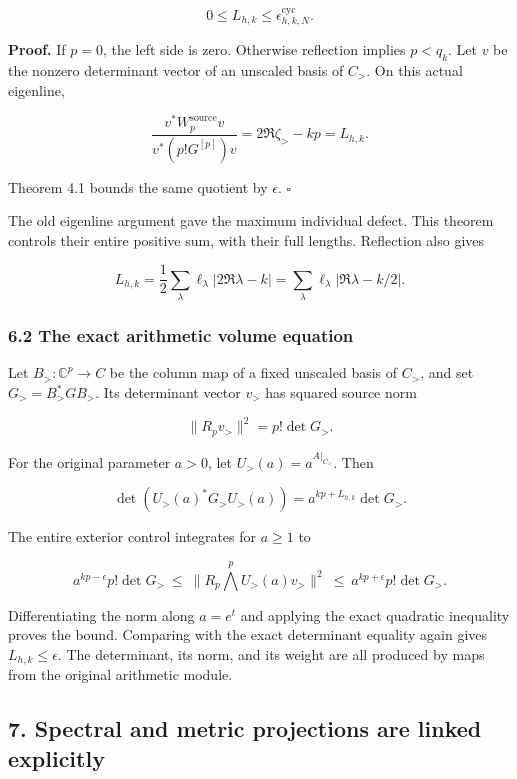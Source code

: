 \[
\boxed{0\leq L_{h,k}\leq\epsilon_{h,k,N}^{\mathrm{cyc}}.}
\]

\textbf{Proof.} If \(p=0\), the left side is zero. Otherwise reflection
implies \(p<q_k\). Let \(v\) be the nonzero determinant vector of an
unscaled basis of \(C_{>}\). On this actual eigenline,

\[
\frac{v^*W_p^{\mathrm{source}}v}{v^*(p!G^{[p]})v}
=2\Re\zeta_{>}-kp=L_{h,k}.
\]

Theorem 4.1 bounds the same quotient by \(\epsilon\). \(\square\)

The old eigenline argument gave the maximum individual defect. This
theorem controls their entire positive sum, with their full lengths.
Reflection also gives

\[
L_{h,k}
=\frac12\sum_\lambda\ell_\lambda|2\Re\lambda-k|
=\sum_\lambda\ell_\lambda|\Re\lambda-k/2|.
\]

\subsubsection{6.2 The exact arithmetic volume
equation}\label{exterior_trace:the-exact-arithmetic-volume-equation}

Let \(B_{>}:\mathbb C^p\to C\) be the column map of a fixed unscaled
basis of \(C_{>}\), and set \(G_{>}=B_{>}^*GB_{>}\). Its determinant
vector \(v_{>}\) has squared source norm

\[
\|R_pv_{>}\|^2=p!\det G_{>}.
\]

For the original parameter \(a>0\), let \(U_{>}(a)=a^{A|_{C_{>}}}\).
Then

\[
\boxed{
\det(U_{>}(a)^*G_{>}U_{>}(a))
=a^{kp+L_{h,k}}\det G_{>}.
}
\]

The entire exterior control integrates for \(a\geq1\) to

\[
a^{kp-\epsilon}p!\det G_{>}
\ \leq\ \|R_p\bigwedge^pU_{>}(a)v_{>}\|^2
\ \leq\ a^{kp+\epsilon}p!\det G_{>}.
\]

Differentiating the norm along \(a=e^t\) and applying the exact
quadratic inequality proves the bound. Comparing with the exact
determinant equality again gives \(L_{h,k}\leq\epsilon\). The
determinant, its norm, and its weight are all produced by maps from the
original arithmetic module.

\subsection{7. Spectral and metric projections are linked
explicitly}\label{exterior_trace:spectral-and-metric-projections-are-linked-explicitly}

